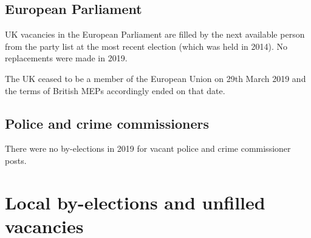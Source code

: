 \documentclass[a4paper,openany]{book}
\begin{document}
\section{European Parliament}

UK vacancies in the European Parliament are filled by the next available person from the party list at the most recent election (which was held in 2014). 
No replacements were made in 2019.

The UK ceased to be a member of the European Union on 29th March 2019 and the terms of British MEPs accordingly ended on that date.

\section{Police and crime commissioners}

There were no by-elections in 2019 for vacant police and crime commissioner posts.

\chapter{Local by-elections and unfilled vacancies}
\end{document}
